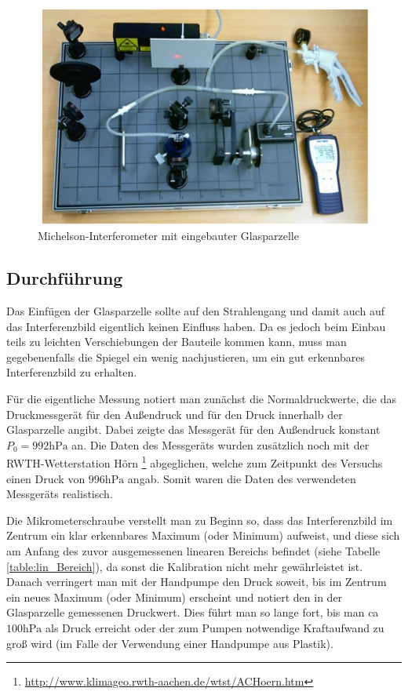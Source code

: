 \documentclass[a4paper, 11pt]{article}
\begin{document}
\begin{figure}[H]
	\centering
	\includegraphics[scale=0.45]{./Bilder/Aufbau_Bild_Luft.png}
	\caption{Michelson-Interferometer mit eingebauter Glasparzelle}
	\label{pic:Aufbau_Bild_Luft}	
\end{figure}

\subsection{Durchführung}
Das Einfügen der Glasparzelle sollte auf den Strahlengang und damit auch auf das Interferenzbild eigentlich keinen Einfluss haben. Da es jedoch beim Einbau teils zu leichten Verschiebungen der Bauteile kommen kann, muss man gegebenenfalls die Spiegel ein wenig nachjustieren, um ein gut erkennbares Interferenzbild zu erhalten.

Für die eigentliche Messung notiert man zunächst die Normaldruckwerte, die das Druckmessgerät für den Außendruck und für den Druck innerhalb der Glasparzelle angibt. Dabei zeigte das Messgerät für den Außendruck konstant $P_0=992\mathrm{hPa}$ an. Die Daten des Messgeräts wurden zusätzlich noch mit der RWTH-Wetterstation Hörn \footnote{\url{http://www.klimageo.rwth-aachen.de/wtst/ACHoern.htm}} abgeglichen, welche zum Zeitpunkt des Versuchs einen Druck von $996\mathrm{hPa}$ angab. Somit waren die Daten des verwendeten Messgeräts realistisch.
 
Die Mikrometerschraube verstellt man zu Beginn so, dass das Interferenzbild im Zentrum ein klar erkennbares Maximum (oder Minimum) aufweist, und diese sich am Anfang des zuvor ausgemessenen linearen Bereichs befindet (siehe Tabelle \ref{table:lin_Bereich}), da sonst die Kalibration nicht mehr gewährleistet ist.
Danach verringert man mit der Handpumpe den Druck soweit, bis im Zentrum ein neues Maximum (oder Minimum) erscheint und notiert den in der Glasparzelle gemessenen Druckwert. Dies führt man so lange fort, bis man ca $ 100 \mathrm{hPa}$ als Druck erreicht oder der zum Pumpen notwendige Kraftaufwand zu groß wird (im Falle der Verwendung einer Handpumpe aus  Plastik).
\end{document}
